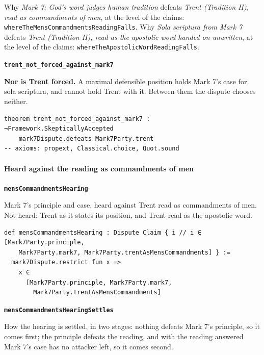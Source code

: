 \documentclass[11pt]{article}
\begin{document}
\noindent Why \emph{Mark 7: God’s word judges human tradition} defeats \emph{Trent (Tradition II), read as commandments of men}, at the level of the claims: \texttt{where\allowbreak{}The\allowbreak{}Mens\allowbreak{}Commandments\allowbreak{}Reading\allowbreak{}Falls}.
\noindent Why \emph{Sola scriptura from Mark 7} defeats \emph{Trent (Tradition II), read as the apostolic word handed on unwritten}, at the level of the claims: \texttt{where\allowbreak{}The\allowbreak{}Apostolic\allowbreak{}Word\allowbreak{}Reading\allowbreak{}Falls}.
\par\medskip\noindent\textbf{\texttt{trent\_\allowbreak{}not\_\allowbreak{}forced\_\allowbreak{}against\_\allowbreak{}mark7}}\par\nobreak\noindent
\textbf{Nor is Trent forced.} A maximal defensible position holds Mark 7’s case for sola scriptura, and cannot hold Trent with it. Between them the dispute chooses neither.

{\small\begin{verbatim}
theorem trent_not_forced_against_mark7 : ¬Framework.SkepticallyAccepted
    mark7Dispute.defeats Mark7Party.trent
-- axioms: propext, Classical.choice, Quot.sound
\end{verbatim}}
\paragraph*{Heard against the reading as commandments of men}
\leavevmode\par\nobreak
\par\medskip\noindent\textbf{\texttt{mens\allowbreak{}Commandments\allowbreak{}Hearing}}\par\nobreak\noindent
Mark 7’s principle and case, heard against Trent read as commandments of men. Not heard: Trent as it states its position, and Trent read as the apostolic word.

{\small\begin{verbatim}
def mensCommandmentsHearing : Dispute Claim { i // i ∈ [Mark7Party.principle,
    Mark7Party.mark7, Mark7Party.trentAsMensCommandments] } :=
  mark7Dispute.restrict fun x =>
    x ∈
      [Mark7Party.principle, Mark7Party.mark7,
        Mark7Party.trentAsMensCommandments]
\end{verbatim}}
\par\medskip\noindent\textbf{\texttt{mens\allowbreak{}Commandments\allowbreak{}Hearing\allowbreak{}Settles}}\par\nobreak\noindent
How the hearing is settled, in two stages: nothing defeats Mark 7’s principle, so it comes first; the principle defeats the reading, and with the reading answered Mark 7’s case has no attacker left, so it comes second.
\end{document}
